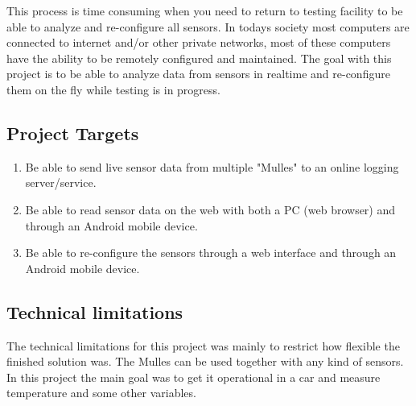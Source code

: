 This process is time consuming when you need to return to testing facility to be able to analyze and re-configure all sensors.
In todays society most computers are connected to internet and/or other private networks, most of these computers have the ability to be remotely configured and maintained.
The goal with this project is to be able to analyze data from sensors in realtime and re-configure them on the fly while testing is in progress.
\subsection{Project Targets}
\begin{enumerate}
\item Be able to send live sensor data from multiple "Mulles" to an online logging server/service.
\item Be able to read sensor data on the web with both a PC (web browser) and through an Android mobile device.
\item Be able to re-configure the sensors through a web interface and through an Android mobile device.
\end{enumerate}

\subsection{Technical limitations}
The technical limitations for this project was mainly to restrict how flexible the finished solution was.
The Mulles can be used together with any kind of sensors.
In this project the main goal was to get it operational in a car and measure temperature and some other variables.


